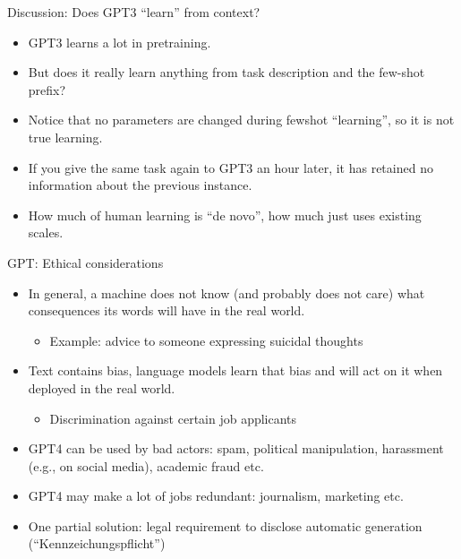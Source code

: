 \begin{frame}{Discussion: Does GPT3 ``learn'' from context?}

\vfill

  \begin{itemize}
\item GPT3 learns a lot in pretraining.
    \item But does it really learn anything from
task description and    the few-shot prefix?
    \item Notice that no parameters are changed during
    fewshot ``learning'', so it is not true learning.
    \item If you give the same task again to GPT3 an
    hour later, it has retained no information about the
    previous instance.
    \item How much of human learning is ``de novo'',
    how much just uses existing scales.

    \end{itemize}

\vfill

\end{frame}


\begin{frame}{GPT: Ethical considerations}

\vfill

  \begin{itemize}
\item In general, a machine does not know (and
probably does not care) what consequences its words will have
in the real world.
  \begin{itemize}
\item Example: advice to someone expressing suicidal thoughts
    \end{itemize}
\item Text contains bias, language models learn that
bias and will act on it when deployed in the real world.
  \begin{itemize}
\item Discrimination against certain job applicants
    \end{itemize}
\item GPT4 can be
used by bad actors: spam, political manipulation, harassment
(e.g., on social media), academic fraud etc.
\item GPT4 may make a
lot of jobs redundant: journalism, marketing etc.
\item One partial solution: legal requirement to
disclose automatic generation (``Kennzeichungspflicht'')
    \end{itemize}

\vfill

\end{frame}

